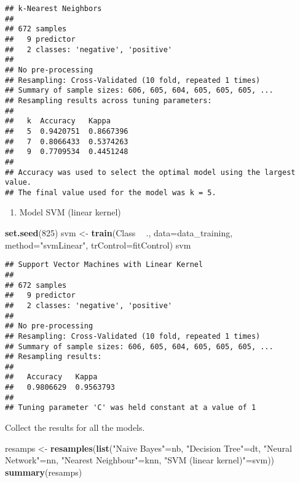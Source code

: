 \documentclass[]{article}
\newenvironment{Shaded}{\begin{snugshade}}{\end{snugshade}}
\newcommand{\DataTypeTok}[1]{\textcolor[rgb]{0.13,0.29,0.53}{#1}}
\newcommand{\DecValTok}[1]{\textcolor[rgb]{0.00,0.00,0.81}{#1}}
\newcommand{\KeywordTok}[1]{\textcolor[rgb]{0.13,0.29,0.53}{\textbf{#1}}}
\newcommand{\NormalTok}[1]{#1}
\newcommand{\OperatorTok}[1]{\textcolor[rgb]{0.81,0.36,0.00}{\textbf{#1}}}
\newcommand{\StringTok}[1]{\textcolor[rgb]{0.31,0.60,0.02}{#1}}
\providecommand{\tightlist}{%
  \setlength{\itemsep}{0pt}\setlength{\parskip}{0pt}}
\begin{document}
\begin{verbatim}
## k-Nearest Neighbors 
## 
## 672 samples
##   9 predictor
##   2 classes: 'negative', 'positive' 
## 
## No pre-processing
## Resampling: Cross-Validated (10 fold, repeated 1 times) 
## Summary of sample sizes: 606, 605, 604, 605, 605, 605, ... 
## Resampling results across tuning parameters:
## 
##   k  Accuracy   Kappa    
##   5  0.9420751  0.8667396
##   7  0.8066433  0.5374263
##   9  0.7709534  0.4451248
## 
## Accuracy was used to select the optimal model using the largest value.
## The final value used for the model was k = 5.
\end{verbatim}

\begin{enumerate}
\def\labelenumi{\arabic{enumi}.}
\setcounter{enumi}{4}
\tightlist
\item
  Model SVM (linear kernel)
\end{enumerate}

\begin{Shaded}
\begin{Highlighting}[]
\KeywordTok{set.seed}\NormalTok{(}\DecValTok{825}\NormalTok{)}
\NormalTok{svm <-}\StringTok{ }\KeywordTok{train}\NormalTok{(Class }\OperatorTok{~}\StringTok{ }\NormalTok{., }
             \DataTypeTok{data=}\NormalTok{data_training, }
             \DataTypeTok{method=}\StringTok{"svmLinear"}\NormalTok{,}
             \DataTypeTok{trControl=}\NormalTok{fitControl)}
\NormalTok{svm}
\end{Highlighting}
\end{Shaded}

\begin{verbatim}
## Support Vector Machines with Linear Kernel 
## 
## 672 samples
##   9 predictor
##   2 classes: 'negative', 'positive' 
## 
## No pre-processing
## Resampling: Cross-Validated (10 fold, repeated 1 times) 
## Summary of sample sizes: 606, 605, 604, 605, 605, 605, ... 
## Resampling results:
## 
##   Accuracy   Kappa    
##   0.9806629  0.9563793
## 
## Tuning parameter 'C' was held constant at a value of 1
\end{verbatim}

Collect the results for all the models.

\begin{Shaded}
\begin{Highlighting}[]
\NormalTok{resamps <-}\StringTok{ }\KeywordTok{resamples}\NormalTok{(}\KeywordTok{list}\NormalTok{(}\StringTok{"Naive Bayes"}\NormalTok{=nb,}
                          \StringTok{"Decision Tree"}\NormalTok{=dt,}
                          \StringTok{"Neural Network"}\NormalTok{=nn,}
                          \StringTok{"Nearest Neighbour"}\NormalTok{=knn,}
                          \StringTok{"SVM (linear kernel)"}\NormalTok{=svm))}
\KeywordTok{summary}\NormalTok{(resamps)}
\end{Highlighting}
\end{Shaded}
\end{document}
